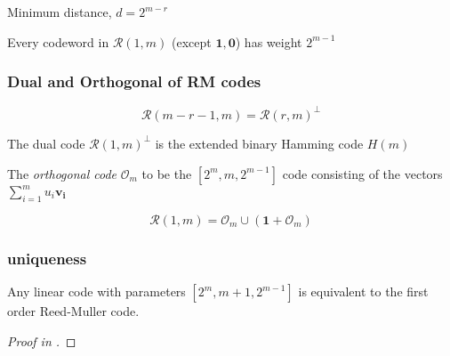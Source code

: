 \documentclass{beamer}
\newcommand{\RM}[2]{\ensuremath{\mathcal{R}(#1,#2)}}
\newcommand{\rem}{Reed-Muller}
\newcommand{\V}[1]{\ensuremath{\mathbf{#1}}}
\begin{document}

\begin{frame}
\begin{theorem}
Minimum distance, $d=2^{m-r}$
\end{theorem}

\begin{obs}
\label{equidistant}
Every codeword in $\RM{1}{m}$ (except $\V{1}, \V{0}$) has weight $2^{m-1}$
\end{obs}

\end{frame}


\begin{frame}
\frametitle{Dual and Orthogonal of RM codes}
\begin{theorem}
  \begin{equation*}
    \RM{m-r-1}{m} = \RM{r}{m}^{\bot}
  \end{equation*}
\end{theorem}

\begin{theorem}
The dual code $\RM{1}{m}^{\bot}$ is the extended binary Hamming code $H(m)$ 
\end{theorem}

The \emph{orthogonal code} $\mathcal{O}_m$ to be the $[2^m, m, 2^{m-1}]$ code consisting of the vectors $ \sum_{i=1}^m{u_i\V{v_i}} $

\begin{theorem}
  \begin{equation*}
  \RM{1}{m} = \mathcal{O}_m \cup (\V{1} + \mathcal{O}_m) 
\end{equation*}
\end{theorem}

\end{frame}



\begin{frame}
 \frametitle{uniqueness}
\begin{theorem}
   Any linear code with parameters $[2^m, m+1, 2^{m-1}]$ is equivalent to the first order \rem{} code.
\begin{proof}
[Proof in \cite{uniq}]
\end{proof} \label{uniqness}
\end{theorem}

\end{frame}
\end{document}
